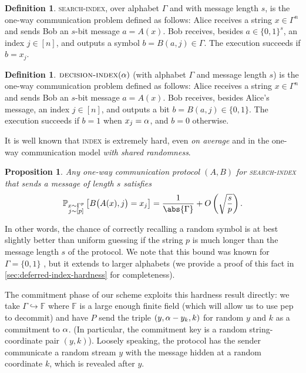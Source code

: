 \documentclass[10pt,a4paper]{article}
\newtheorem{proposition}[theorem]{Proposition}
\theoremstyle{definition}
\newtheorem{definition}[theorem]{Definition}
\newcommand{\field}{\mathbb{F}}
\renewcommand{\P}{\mathbb P}
\newcommand{\bitset}{\{0,1\}}
\newcommand{\indexproblem}{\normalfont\textsc{index}\xspace}
\newcommand{\searchindex}{\normalfont\textsc{search-index}\xspace}
\newcommand{\decisionindex}{\normalfont\textsc{decision-index}\xspace}
\newcommand{\pepprotocol}{\textsf{pep}\xspace}
\newcommand{\pcommitlength}{p}
\newcommand{\pcommitstring}{y}
\newcommand{\alphabet}{\Gamma}
\def\fe#1{
    \ifnum#1=1
        \alpha
    \else
    \ifnum#1=2
        \beta
    \else
    \ifnum#1=3
        \gamma
    \fi\fi\fi
}
\begin{document}
\begin{definition}
    \label{def:search-index}
    \searchindex, over alphabet $\alphabet$ and with message length $s$, is the one-way communication problem defined as follows: Alice receives a string $x \in \alphabet^n$ and sends Bob an $s$-bit message $a = A(x)$. Bob receives, besides $a \in \bitset^s$, an index $j \in [n]$, and outputs a symbol $b = B(a, j) \in \alphabet$. The execution succeeds if $b = x_j$.
\end{definition}

\begin{definition}
    \label{def:decision-index}
    $\decisionindex(\fe1)$ (with alphabet $\alphabet$ and message length $s$) is the one-way communication problem defined as follows: Alice receives a string $x \in \alphabet^n$ and sends Bob an $s$-bit message $a = A(x)$. Bob receives, besides Alice's message, an index $j \in [n]$, and outputs a bit $b = B(a, j) \in \bitset$. The execution succeeds if $b = 1$ when $x_j = \fe1$, and $b = 0$ otherwise.
\end{definition}

It is well known that \indexproblem is extremely hard, even \emph{on average} and in the one-way communication model \emph{with shared randomness}. 

\begin{proposition}
\label{prop:index-hardness}
    Any one-way communication protocol $(A, B)$ for \searchindex that sends a message of length $s$ satisfies 
    \begin{equation*}
        \P_{\substack{x \sim \alphabet^\pcommitlength\\ j \sim [\pcommitlength]}}\left[B\big(A(x), j\big) = x_j\right] = \frac1{\abs{\alphabet}}+O\left(\sqrt{\frac{s}{\pcommitlength}}\right).
    \end{equation*}
\end{proposition}

In other words, the chance of correctly recalling a random symbol is at best slightly better than uniform guessing if the string $\pcommitlength$ is much longer than the message length $s$ of the protocol. We note that this bound was known for $\alphabet = \bitset$ \cite{RY20}, but it extends to larger alphabets (we provide a proof of this fact in \cref{sec:deferred-index-hardness} for completeness).

The commitment phase of our scheme exploits this hardness result directly: we take $\alphabet \hookrightarrow \field$ where $\field$ is a large enough finite field (which will allow us to use \pepprotocol to decommit) and have $P$ send the triple $(\pcommitstring, \fe1 - \pcommitstring_k, k)$ for random $\pcommitstring$ and $k$ as a commitment to $\fe1$. (In particular, the commitment key is a random string-coordinate pair $(\pcommitstring, k)$). Loosely speaking, the protocol has the sender communicate a random stream $\pcommitstring$ with the message hidden at a random coordinate $k$, which is revealed after $\pcommitstring$.
\end{document}
